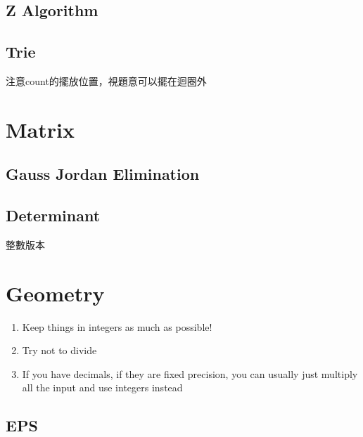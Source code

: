 \documentclass[10pt,oneside]{article}
\begin{document}
\begin{landscape}
\begin{multicols}{2}

\subsection{Z Algorithm}


\subsection{Trie}
{\normalsize 
注意count的擺放位置，視題意可以擺在迴圈外
}

\section{Matrix}

\subsection{Gauss Jordan Elimination}

\subsection{Determinant}

{\normalsize 
整數版本
}



\section{Geometry}

{\normalsize 
\begin{enumerate}
	\item Keep things in integers as much as possible!
	\item Try not to divide
	\item If you have decimals, if they are fixed precision, you can usually just multiply all the input and use integers instead
\end{enumerate}
}

\subsection{EPS}


\end{multicols}
\end{landscape}
\end{document}
